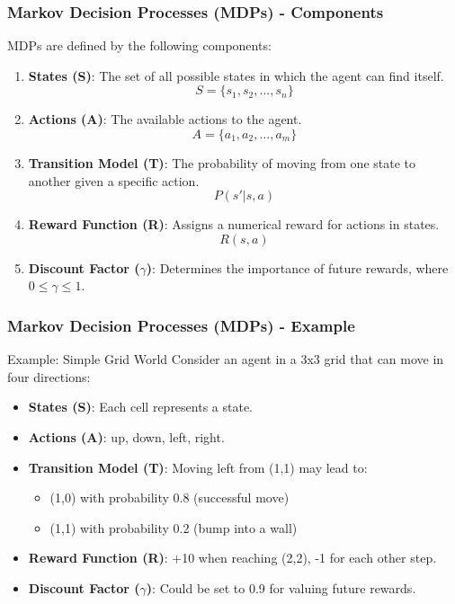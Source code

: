 \documentclass[aspectratio=169]{beamer}
\begin{document}
\begin{frame}[fragile]
    \frametitle{Markov Decision Processes (MDPs) - Components}
    MDPs are defined by the following components:
    \begin{enumerate}
        \item \textbf{States (S)}: The set of all possible states in which the agent can find itself. 
        \[
        S = \{s_1, s_2, \ldots, s_n\}
        \]
        
        \item \textbf{Actions (A)}: The available actions to the agent. 
        \[
        A = \{a_1, a_2, \ldots, a_m\}
        \]
        
        \item \textbf{Transition Model (T)}: The probability of moving from one state to another given a specific action.
        \[
        P(s'|s, a)
        \]

        \item \textbf{Reward Function (R)}: Assigns a numerical reward for actions in states.
        \[
        R(s, a)
        \]

        \item \textbf{Discount Factor ($\gamma$)}: Determines the importance of future rewards, where $0 \leq \gamma \leq 1$.
    \end{enumerate}
\end{frame}

\begin{frame}[fragile]
    \frametitle{Markov Decision Processes (MDPs) - Example}
    \begin{block}{Example: Simple Grid World}
        Consider an agent in a 3x3 grid that can move in four directions:
        \begin{itemize}
            \item \textbf{States (S)}: Each cell represents a state.
            \item \textbf{Actions (A)}: {up, down, left, right}.
            \item \textbf{Transition Model (T)}: Moving left from (1,1) may lead to:
            \begin{itemize}
                \item (1,0) with probability 0.8 (successful move)
                \item (1,1) with probability 0.2 (bump into a wall)
            \end{itemize}
            \item \textbf{Reward Function (R)}: +10 when reaching (2,2), -1 for each other step.
            \item \textbf{Discount Factor ($\gamma$)}: Could be set to 0.9 for valuing future rewards.
        \end{itemize}
    \end{block}
\end{frame}
\end{document}
